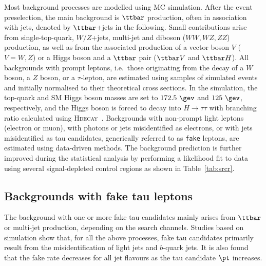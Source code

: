 \documentclass[PAPER, coverpage, atlasdraft=true, texlive=2016, UKenglish]{\ATLASLATEXPATH atlasdoc}
\begin{document}
Most background processes are modelled using MC simulation.
After the event preselection, the main background is $\ttbar$ production, often in association with jets, denoted by $\ttbar$+jets in the following.
Small contributions arise from single-top-quark, $W/Z$+jets, multi-jet and diboson ($WW,WZ,ZZ$) production, as well as from the associated 
production of a vector boson $V$ ($V=W,Z$) or a Higgs boson and a $\ttbar$ pair ($\ttbar V$ and $\ttbar H$). All backgrounds 
with prompt leptons, i.e.\ those originating from the decay of a $W$ boson, a $Z$ boson, or a $\tau$-lepton,
are estimated using samples of simulated events and initially normalised to their theoretical cross sections.
In the simulation, the top-quark and SM Higgs boson masses are set to $172.5~\gev$ and $125~\gev$, respectively,
and the Higgs boson is forced to decay into $H\to \tau\tau$ with branching ratio calculated using \textsc{Hdecay}~\cite{Djouadi:1997yw}.  
Backgrounds with non-prompt light leptons (electron or muon), with photons or jets misidentified as electrons, or with jets misidentified as tau candidates, 
generically referred to as \texttt{fake} leptons, are estimated using data-driven methods. 
The background prediction is further improved during the statistical analysis by performing a likelihood 
fit to data using several signal-depleted control regions as shown in Table~\ref{tab:srcr}.

\subsection{Backgrounds with fake tau leptons}
\label{sec:faketaus}
The background with one or more fake tau candidates mainly arises from $\ttbar$ or
multi-jet production, depending on the search channels.
Studies based on simulation show that, for all the above processes, fake tau candidates primarily result from the
misidentification of light jets and $b$-quark jets.
It is also found that the fake rate decreases for all jet flavours as the tau candidate $\pt$ increases.
\end{document}
